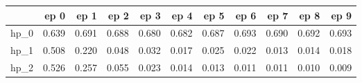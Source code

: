 \begin{tabular}{lrrrrrrrrrr}
\toprule
{} &   ep 0 &   ep 1 &   ep 2 &   ep 3 &   ep 4 &   ep 5 &   ep 6 &   ep 7 &   ep 8 &   ep 9 \\
\midrule
hp\_0 &  0.639 &  0.691 &  0.688 &  0.680 &  0.682 &  0.687 &  0.693 &  0.690 &  0.692 &  0.693 \\
hp\_1 &  0.508 &  0.220 &  0.048 &  0.032 &  0.017 &  0.025 &  0.022 &  0.013 &  0.014 &  0.018 \\
hp\_2 &  0.526 &  0.257 &  0.055 &  0.023 &  0.014 &  0.013 &  0.011 &  0.011 &  0.010 &  0.009 \\
\bottomrule
\end{tabular}
